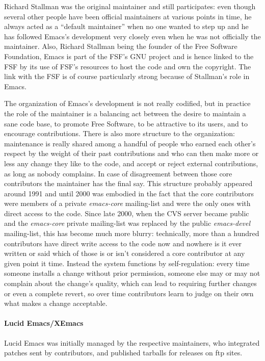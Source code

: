 \documentclass[format=acmsmall, review]{acmart}
\begin{document}
Richard Stallman was the original maintainer and still participates: even
though several other people have been official maintainers at various points
in time, he always acted as a ``default maintainer'' when no one wanted to
step up and he has followed Emacs's development very closely even when he
was not officially the maintainer.  Also, Richard Stallman being
the founder of the Free Software Foundation, Emacs is part of the FSF's GNU
project and is hence linked to the FSF by its use of FSF's resources to host
the code and own the copyright.  The link with the FSF is of course
particularly strong because of Stallman's role in Emacs.

The organization of Emacs's development is not really codified, but in
practice the role of the maintainer is a balancing act between the desire to
maintain a sane code base, to promote Free Software, to be attractive to its
users, and to encourage contributions.  There is also more structure to the
organization: maintenance is really shared among a handful of people who
earned each other's respect by the weight of their past contributions and
who can then make more or less any change they like to the code, and accept
or reject external contributions, as long as nobody complains.  In case of
disagreement between those core contributors the maintainer has the final
say.  This structure probably appeared around 1991 and until 2000 was
embodied in the fact that the core contributors were members of a private
\emph{emacs-core} mailing-list and were the only ones with direct access to
the code.  Since late 2000, when the CVS server became public and the
\emph{emacs-core} private mailing-list was replaced by the public
\emph{emacs-devel} mailing-list, this has become much more blurry:
technically, more than a hundred contributors have direct write access to
the code now and nowhere is it ever written or said which of those is or
isn't considered a core contributor at any given point it time.  Instead the
system functions by self-regulation: every time someone installs a change
without prior permission, someone else may or may not complain about the
change's quality, which can lead to requiring further changes or even
a complete revert, so over time contributors learn to judge on their own
what makes a change acceptable.

\paragraph{Lucid Emacs/XEmacs}
Lucid Emacs was initially managed by the respective maintainers, who
integrated patches sent by contributors, and published tarballs for
releases on ftp sites.
\end{document}

